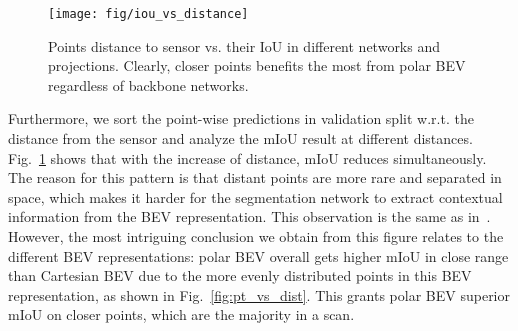 \documentclass[10pt,twocolumn,letterpaper]{article}
\begin{document}
\begin{figure}
  \centering
  \texttt{[image: fig/iou\_vs\_distance]}
  \vspace{-4pt}
  \caption{Points distance to sensor vs. their IoU in different networks and projections. Clearly, closer points benefits the most from polar BEV regardless of backbone networks.}
  \label{fig:iou_vs_dist}
  \vspace{-15pt}
\end{figure}

Furthermore, we sort the point-wise predictions in validation split w.r.t. the distance from the sensor and analyze the mIoU result at different distances. Fig.~\ref{fig:iou_vs_dist} shows that with the increase of distance, mIoU reduces simultaneously. The reason for this pattern is that distant points are more rare and separated in space, which makes it harder for the segmentation network to extract contextual information from the BEV representation. This observation is the same as in~\cite{behley2019iccv}. However, the most intriguing conclusion we obtain from this figure relates to the different BEV representations: polar BEV overall gets higher mIoU in close range than Cartesian BEV due to the more evenly distributed points in this BEV representation, as shown in Fig.~\ref{fig:pt_vs_dist}. This grants polar BEV superior mIoU on closer points, which are the majority in a scan.



\iffalse

\subsection{Qualitative Results}

At last, we present our qualitative results in Fig.~\ref{fig:qualitative}. We present both Cartesian BEV segmentation results and polar BEV segmentation results in the first two columns. We also highlight the difference between these two predictions in the third column while the groundtruth labels are shown in the last column. Both BEV methods appear to have very good prediction accuracy at the first glimpse even though their mIoU are different. This indicates the main performance gap between the two is in the details.  The traditional BEV mistakes terrain for sidewalk in row 5. Polar BEV also impressively but falsely predicts a perfectly sharp sidewalk in row 4. Both BEV methods have trouble distinguishing sidewalk and road in most cases.


\begin{figure*}
\centering
  \texttt{[image: fig/prediction\_visualization.png]}
  \caption{Prediction results made by our traditional BEV and Polar BEV networks on SemanticKITTI \textbf{val} split. Best viewed in color.}
  \label{fig:qualitative}
\end{figure*}
\fi 
\end{document}
